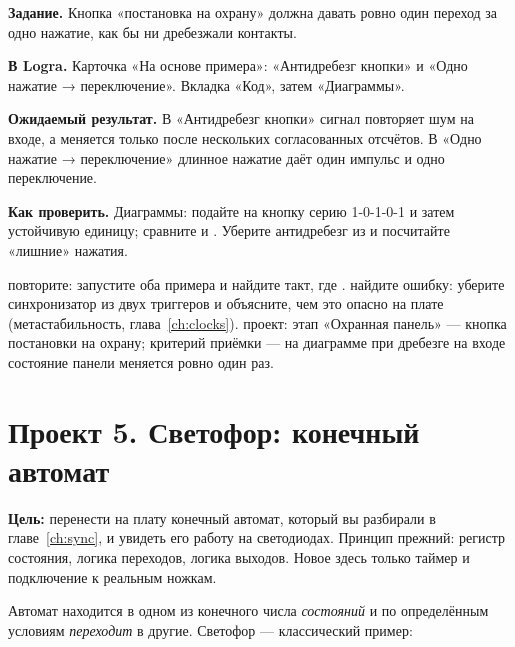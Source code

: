 \begin{diybox}
\textbf{Задание.} Кнопка «постановка на охрану» должна давать ровно один переход за одно нажатие, как бы ни дребезжали контакты.

\textbf{В Logra.} Карточка «На основе примера»: «Антидребезг кнопки» и «Одно нажатие → переключение». Вкладка «Код», затем «Диаграммы».

\textbf{Ожидаемый результат.} В «Антидребезг кнопки» сигнал  повторяет шум на входе, а  меняется только после нескольких согласованных отсчётов. В «Одно нажатие → переключение» длинное нажатие даёт один импульс  и одно переключение.

\textbf{Как проверить.} Диаграммы: подайте на кнопку серию 1-0-1-0-1 и затем устойчивую единицу; сравните  и . Уберите антидребезг из  и посчитайте «лишние» нажатия.

 повторите: запустите оба примера и найдите такт, где .  найдите ошибку: уберите синхронизатор из двух триггеров и объясните, чем это опасно на плате (метастабильность, глава~\ref{ch:clocks}).  проект: этап «Охранная панель» --- кнопка постановки на охрану; критерий приёмки --- на диаграмме при дребезге на входе состояние панели меняется ровно один раз.
\end{diybox}

\section{Проект 5. Светофор: конечный автомат}

\textbf{Цель:} перенести на плату конечный автомат, который вы разбирали в
главе~\ref{ch:sync}, и увидеть его работу на светодиодах. Принцип прежний: регистр
состояния, логика переходов, логика выходов. Новое здесь только таймер и
подключение к реальным ножкам.

Автомат находится в одном из конечного числа \emph{состояний} и по
определённым условиям \emph{переходит} в другие. Светофор --- классический
пример:

